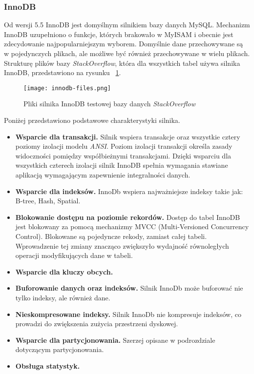 \subsubsection{InnoDB}
Od wersji 5.5 InnoDB jest domyślnym silnikiem bazy danych MySQL. Mechanizm InnoDB uzupełniono o funkcje, których brakowało w MyISAM i obecnie jest zdecydowanie najpopularniejszym wyborem. Domyślnie dane przechowywane są w pojedynczych plikach, ale możliwe być również przechowywane w wielu plikach. Strukturę plików bazy \textit{StackOverflow}, która dla wszystkich tabel używa silnika InnoDB, przedstawiono na rysunku ~\ref{fig:innodb-fileslabel}.
\begin{figure}[!h]
	\caption{Pliki silnika InnoDB testowej bazy danych \textit{StackOverflow}}
	\centering
	\texttt{[image: innodb-files.png]}
	\label{fig:innodb-fileslabel}
\end{figure}
Poniżej przedstawiono podstawowe charakterystyki silnika.
\begin{itemize}
	\item \textbf{Wsparcie dla transakcji.} Silnik wspiera transakcje oraz wszystkie cztery poziomy izolacji modelu \textit{ANSI}. Poziom izolacji transakcji określa zasady widoczności pomiędzy współbieżnymi transakcjami. Dzięki wsparciu dla wszystkich czterech izolacji  silnik InnoDB spełnia wymagania stawiane aplikacją wymagającym zapewnienie integralności danych. 
	\item \textbf{Wsparcie dla indeksów.} InnoDb wspiera najważniejsze indeksy takie jak: B-tree, Hash, Spatial.
	\item \textbf{Blokowanie dostępu na poziomie rekordów. } Dostęp do tabel InnoDB jest blokowany za pomocą mechanizmy MVCC (Multi-Versioned Concurrency Control). Blokowane są pojedyncze rekody, zamiast całej tabeli. Wprowadzenie tej zmiany znacząco zwiększyło wydajność równoległych operacji modyfikujących dane w tabeli.
	\item \textbf{Wsparcie dla kluczy obcych.}
	\item \textbf{Buforowanie danych oraz indeksów.} Silnik InnoDb może buforować nie tylko indeksy, ale również dane.
	\item  \textbf{Nieskompresowane indeksy.} Silnik InnoDb nie kompresuje indeksów, co prowadzi do zwiększenia zużycia przestrzeni dyskowej.
	\item \textbf{Wsparcie dla partycjonowania.} Szerzej opisane w podrozdziale dotyczącym partycjonowania.
	\item \textbf{Obsługa statystyk.}
\end{itemize}

